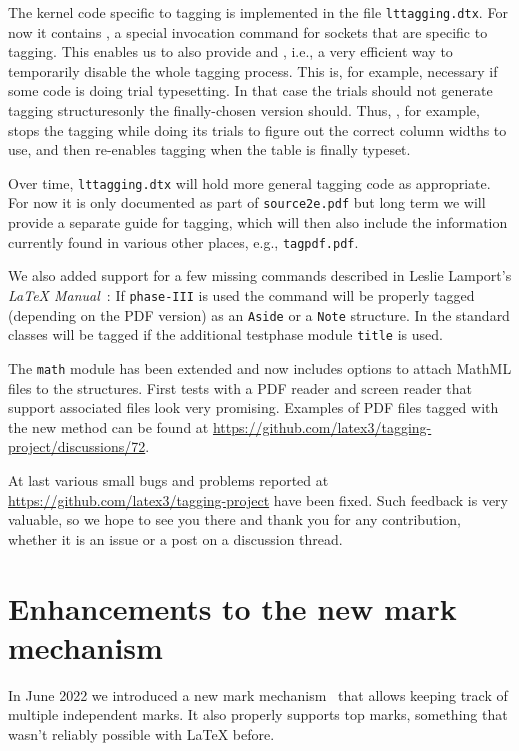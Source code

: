 \documentclass{ltnews}
\providecommand\Dash {\unskip \textemdash}
\begin{document}
The kernel code specific to tagging is implemented in the file
\texttt{lttagging.dtx}. For now it contains , a
special invocation command for sockets that are specific to
tagging. This enables us to also provide  and
, i.e., a very efficient way to temporarily disable
the whole tagging process. This is, for example, necessary if some
code is doing trial typesetting. In that case the trials should not
generate tagging structures\Dash only the finally-chosen version
should. Thus, , for example, stops the tagging while
doing its trials to figure out the correct column widths to use, and
then re-enables tagging when the table is finally typeset.

Over time, \texttt{lttagging.dtx} will hold more general tagging code
as appropriate. For now it is only documented as part of
\texttt{source2e.pdf} but long term we will provide a separate guide
for tagging, which will then also include the information currently
found in various other places, e.g., \texttt{tagpdf.pdf}.

We also added support for a few missing commands
described in Leslie Lamport's \emph{\LaTeX{}
Manual}~\cite{39:Lamport}: If \texttt{phase-III} is used
the  command will be properly tagged (depending on
the PDF version) as an \texttt{Aside} or a \texttt{Note} structure.
In the standard classes  will be tagged if the additional
testphase module \texttt{title} is used.

The \texttt{math} module has been extended and now includes
options to attach MathML files to the structures.
First tests with a PDF reader and screen reader that support
associated files look very promising. Examples of PDF files tagged with the
new method can be found at
\url{https://github.com/latex3/tagging-project/discussions/72}.

At last various small bugs and problems reported at
\url{https://github.com/latex3/tagging-project}
have been fixed.
Such feedback is very valuable,
so we hope to see you there and thank you for
any contribution, whether it is an issue or a post on a discussion
thread.



\section{Enhancements to the new mark mechanism}

In June 2022 we introduced a new mark mechanism~\cite[p.~76]{39:ltnews} that allows keeping track of multiple
independent marks. It also properly supports top marks, something that wasn't
reliably possible with \LaTeX{} before.
\end{document}
